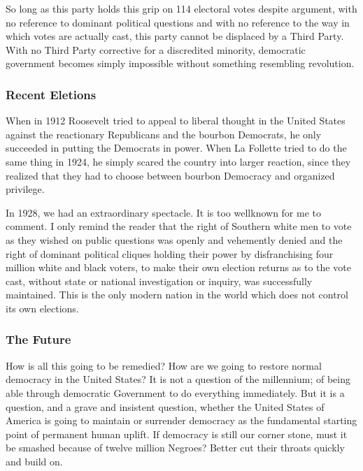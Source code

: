 \documentclass[letterpaper,10pt,english]{jupyterBook}
\begin{document}
\sphinxAtStartPar
So long as this party holds this grip on 114 electoral votes despite argument, with no reference to dominant political questions and with no reference to the way in which votes are actually cast, this party cannot be displaced by a Third Party. With no Third Party corrective for a discredited minority, democratic government becomes simply impossible without something resembling revolution.


\subsubsection{Recent Eletions}
\label{\detokenize{Volumes/36/05/negro_citizen:recent-eletions}}
\sphinxAtStartPar
When in 1912 Roosevelt tried to appeal to liberal thought in the United States against the reactionary Republicans and the bourbon Democrats, he only succeeded in putting the Democrats in power. When La Follette tried to do the same thing in 1924, he simply scared the country into larger reaction, since they realized that they had to choose between bourbon Democracy and organized privilege.

\sphinxAtStartPar
In 1928, we had an extraordinary spectacle. It is too well\sphinxhyphen{}known for me to comment. I only remind the reader that the right of Southern white men to vote as they wished on public questions was openly and vehemently denied and the right of dominant political cliques holding their power by disfranchising four million white and black voters, to make their own election returns as to the vote cast, without state or national investigation or inquiry, was successfully maintained. This is the only modern nation in the world which does not control its own elections.


\subsubsection{The Future}
\label{\detokenize{Volumes/36/05/negro_citizen:the-future}}
\sphinxAtStartPar
How is all this going to be remedied? How are we going to restore normal democracy in the United States? It is not a question of the millennium; of being able through democratic Government to do everything immediately. But it is a question, and a grave and insistent question, whether the United States of America is going to maintain or surrender democracy as the fundamental starting point of permanent human uplift. If democracy is still our corner stone, must it be smashed because of twelve million Negroes? Better cut their throats quickly and build on.
\end{document}
